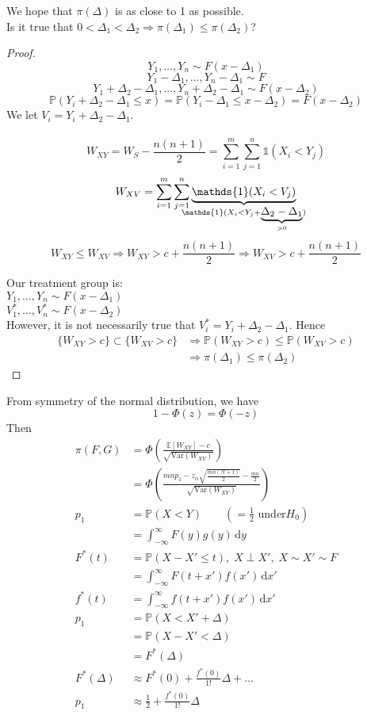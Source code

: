\documentclass[a4paper,12pt]{amsart}
\newcommand{\sumim}{\sum_{i=1}^m}
\newcommand{\sumjn}{\sum_{j=1}^n}
\newcommand{\dx}{\,\mathrm{d}x}
\newcommand{\dy}{\,\mathrm{d}y}
\newcommand{\Var}{\mbox{Var}}
\newcommand{\E}[1]{\mathbb{E}\left[#1\right]}
\newcommand{\p}[1]{\mathbb{P}\left(#1\right)}
\begin{document}
We hope that $\pi(\Delta)$ is as close to 1 as possible. \\
Is it true that $0 < \Delta_1 < \Delta_2 \Rightarrow \pi(\Delta_1) \leq \pi(\Delta_2)$?
\begin{proof}
\[Y_1, \ldots, Y_n \sim F(x - \Delta_1)\]
\[Y_1 - \Delta_1, \ldots, Y_n - \Delta_1 \sim F\]
\[Y_1 + \Delta_2 - \Delta_1, \ldots, Y_n + \Delta_2 - \Delta_1 \sim F(x - \Delta_2)\]
\[\p{Y_i + \Delta_2 - \Delta_1 \leq x} = \p{Y_i - \Delta_1 \leq x - \Delta_2} = F(x- \Delta_2)\]
We let $V_i = Y_i + \Delta_2 - \Delta_1$.
\\
\\
\[W_{XY} = W_S - \frac{n(n+1)}{2} =\sumim \sumjn \mathds{1}(X_i < Y_j)\]
\[W_{XV} = \sumim \sumjn \underbrace{\mathds{1}(X_i < V_j)}_{\mathclap{ \mathds{1}(X_i < Y_j + \underbrace{\Delta_2 - \Delta_1}_{>0})}}\]
\[W_{XY} \leq W_{XV} \Rightarrow W_{XY} > c + \frac{n(n+1)}{2} \Rightarrow W_{XV} > c + \frac{n(n+1)}{2}\]

\noindent
Our treatment group is:\\
$Y_1, \ldots, Y_n \sim F(x- \Delta_1)$\\
$V_1^*, \ldots, V_n^* \sim F(x - \Delta_2)$\\
However, it is not necessarily true that $V_i^* = Y_i + \Delta_2 - \Delta_1$. Hence 
\begin{align*}
\{W_{XY} >c \} \subset \{W_{XV} > c\} &\Rightarrow \p{W_{XY} >c} \leq \p{W_{XV} > c}\\
&\Rightarrow \pi(\Delta_1) \leq \pi(\Delta_2)
\end{align*}
\end{proof}

From symmetry of the normal distribution, we have
\[1 - \Phi(z) = \Phi(-z)\]
Then
\begin{align*}
\pi(F,G) &= \Phi\left( \frac{\E{W_{XY}} - c}{\sqrt{\Var(W_{XY})}}\right)\\
&= \Phi\left(\frac{mnp_1 - z_\alpha \sqrt{\frac{mn(N+1)}{2}} - \frac{mn}{2}}{\sqrt{\Var(W_{XY})}}\right)\\
p_1 &= \p{X<Y} \qquad \left(= \frac{1}{2} \mbox{ under} H_0\right)\\
&= \int_{-\infty}^\infty \! F(y) g(y) \dy\\
F^\ast(t) &= \p{X - X' \leq t}, \; X \perp X',\; X\sim X' \sim F\\
&= \int_{-\infty}^\infty F(t + x') f(x') \dx'\\
f^\ast(t) &= \int_{-\infty}^\infty f(t + x') f(x') \dx'\\
p_1 &= \p{X< X' + \Delta}\\
&= \p{X - X' < \Delta}\\
&= F^*(\Delta)\\
F^\ast(\Delta) &\approx F^*(0) + \frac{f^*(0)}{1!}\Delta + \ldots\\
p_1 &\approx \frac{1}{2} + \frac{f^*(0)}{1!}\Delta
\end{align*}
\end{document}
